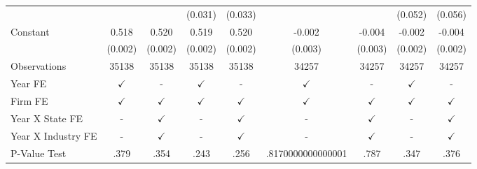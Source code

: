 {\begin{tabular}{l*{8}{c}}
                    &                     &                     &     (0.031)         &     (0.033)         &                     &                     &     (0.052)         &     (0.056)         \\
Constant            &       0.518\sym{***}&       0.520\sym{***}&       0.519\sym{***}&       0.520\sym{***}&      -0.002         &      -0.004\sym{*}  &      -0.002         &      -0.004\sym{*}  \\
                    &     (0.002)         &     (0.002)         &     (0.002)         &     (0.002)         &     (0.003)         &     (0.003)         &     (0.002)         &     (0.002)         \\
\midrule
Observations        &       35138         &       35138         &       35138         &       35138         &       34257         &       34257         &       34257         &       34257         \\
Year FE             &$\checkmark$         &           -         &$\checkmark$         &           -         &$\checkmark$         &           -         &$\checkmark$         &           -         \\
Firm FE             &$\checkmark$         &$\checkmark$         &$\checkmark$         &$\checkmark$         &$\checkmark$         &$\checkmark$         &$\checkmark$         &$\checkmark$         \\
Year X State FE     &           -         &$\checkmark$         &           -         &$\checkmark$         &           -         &$\checkmark$         &           -         &$\checkmark$         \\
Year X Industry FE  &           -         &$\checkmark$         &           -         &$\checkmark$         &           -         &$\checkmark$         &           -         &$\checkmark$         \\
P-Value Test        &        .379         &        .354         &        .243         &        .256         &.8170000000000001         &        .787         &        .347         &        .376         \\
\bottomrule
\end{tabular}
}
